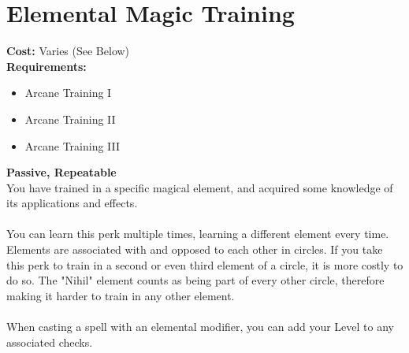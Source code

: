 \section{Elemental Magic Training}
\textbf{Cost:} Varies (See Below)\\
\textbf{Requirements:} \\
\begin{itemize}
	\item Arcane Training I
	\item Arcane Training II
	\item Arcane Training III
\end{itemize}
\textbf{Passive, Repeatable}\\
You have trained in a specific magical element, and acquired some knowledge of its applications and effects.\\
\\
You can learn this perk multiple times, learning a different element every time. Elements are associated with and opposed to each other in circles. If you take this perk to train in a second or even third element of a circle, it is more costly to do so. The "Nihil" element counts as being part of every other circle, therefore making it harder to train in any other element.\\
\\
When casting a spell with an elemental modifier, you can add your Level to any associated checks.

